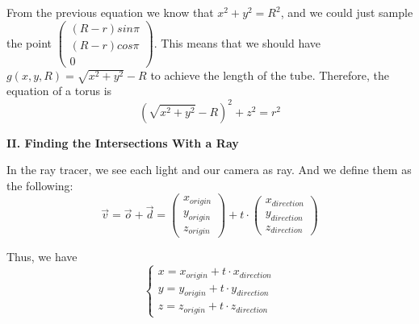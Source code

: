 \documentclass[a4paper,12pt]{report}
\begin{document}
From the previous equation we know that $x^2 +y^2 = R^2$, and we could just sample the point 
$\begin{pmatrix}
(R-r)sin\pi\\
(R-r)cos\pi\\
0
\end{pmatrix}$. This means that we should have $g(x,y,R)=\sqrt{x^2+y^2}-R$ to achieve the length of the tube. Therefore, the equation of a torus is
\begin{equation}
(\sqrt{x^2+y^2}-R)^2+z^2=r^2
\end{equation}

\noindent
\textbf{II. Finding the Intersections With a Ray}

In the ray tracer, we see each light and our camera as ray. And we define them as the following:
\begin{equation}
\overrightarrow{v} = 
\overrightarrow{o}+\overrightarrow{d}
=
\begin{pmatrix}
x_{origin}\\
y_{origin}\\
z_{origin}
\end{pmatrix} + t \cdot{
\begin{pmatrix}
x_{direction}\\
y_{direction}\\
z_{direction}
\end{pmatrix}}
\end{equation}

Thus, we have 
\begin{equation}
\begin{cases}
x=x_{origin}+t\cdot{x_{direction}}\\
y=y_{origin}+t\cdot{y_{direction}}\\
z=z_{origin}+t\cdot{z_{direction}}
\end{cases}
\end{equation}
\end{document}
